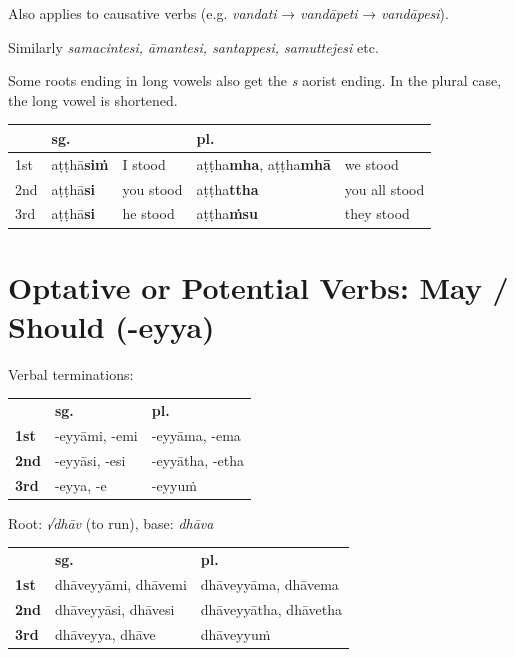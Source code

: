 \documentclass[a4paper]{memoir}
\begin{document}
Also applies to causative verbs (e.g. \emph{vandati} → \emph{vandāpeti} → \emph{vandāpesi}).

Similarly \emph{samacintesi, āmantesi, santappesi, samuttejesi} etc.

Some roots ending in long vowels also get the \emph{s} aorist ending. In the plural case, the long vowel is shortened.

\begin{center}
\begin{tabular}{lllll}
 & \textbf{sg.} &  & \textbf{pl.} & \\[0pt]
\hline
1st & aṭṭhā\textbf{siṁ} & I stood & aṭṭha\textbf{mha}, aṭṭha\textbf{mhā} & we stood\\[0pt]
2nd & aṭṭhā\textbf{si} & you stood & aṭṭha\textbf{ttha} & you all stood\\[0pt]
3rd & aṭṭhā\textbf{si} & he stood & aṭṭha\textbf{ṁsu} & they stood\\[0pt]
\end{tabular}
\end{center}

\clearpage

\section{Optative or Potential Verbs: May / Should (-eyya)}
\label{sec:org29d279f}

{\centering\par
\begin{multicols}{2}

Verbal terminations:

\begin{center}
\begin{tabular}{lll}
 & \textbf{sg.} & \textbf{pl.}\\[0pt]
\textbf{1st} & -eyyāmi, -emi & -eyyāma, -ema\\[0pt]
\textbf{2nd} & -eyyāsi, -esi & -eyyātha, -etha\\[0pt]
\textbf{3rd} & -eyya, -e & -eyyuṁ\\[0pt]
\end{tabular}
\end{center}

\columnbreak

Root: \emph{√dhāv} (to run), base: \emph{dhāva}

\begin{center}
\begin{tabular}{lll}
 & \textbf{sg.} & \textbf{pl.}\\[0pt]
\textbf{1st} & dhāveyyāmi, dhāvemi & dhāveyyāma, dhāvema\\[0pt]
\textbf{2nd} & dhāveyyāsi, dhāvesi & dhāveyyātha, dhāvetha\\[0pt]
\textbf{3rd} & dhāveyya, dhāve & dhāveyyuṁ\\[0pt]
\end{tabular}
\end{center}

\end{multicols}
\par}
\end{document}
